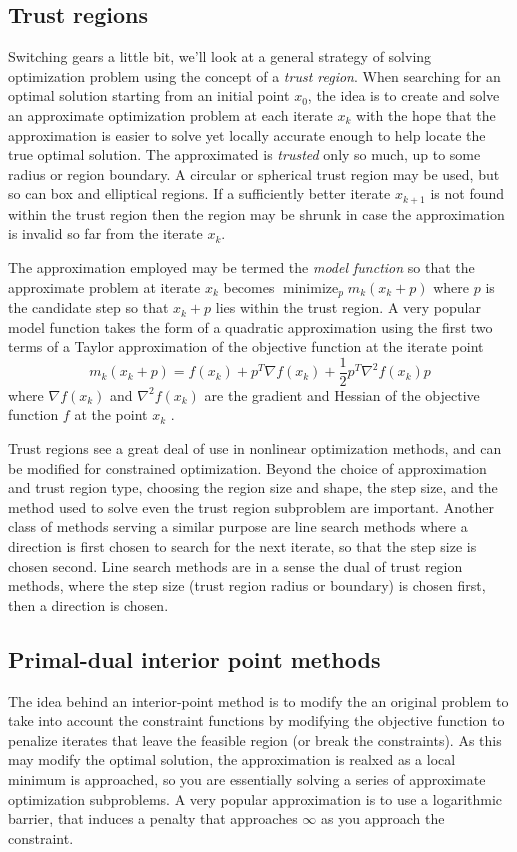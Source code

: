 \subsection{Trust regions}
Switching gears a little bit, we'll look at a general strategy of solving optimization problem using the concept of a \emph{trust region}. When searching for an optimal solution starting from an initial point $x_0$, the idea is to create and solve an approximate optimization problem at each iterate $x_k$ with the hope that the approximation is easier to solve yet locally accurate enough to help locate the true optimal solution. The approximated is \emph{trusted} only so much, up to some radius or region boundary. A circular or spherical trust region may be used, but so can box and elliptical regions. If a sufficiently better iterate $x_{k+1}$ is not found within the trust region then the region may be shrunk in case the approximation is invalid so far from the iterate $x_k$.

The approximation employed may be termed the \emph{model function} so that the approximate problem at iterate $x_k$ becomes $\operatorname{minimize}_p m_k(x_k + p)$ where $p$ is the candidate step so that $x_k + p$ lies within the trust region. A very popular model function takes the form of a quadratic approximation using the first two terms of a Taylor approximation of the objective function at the iterate point
\begin{equation}
  m_k(x_k + p) = f(x_k) + p^T \nabla f(x_k) + \frac{1}{2} p^T \nabla^2 f(x_k) p
\end{equation}
where $\nabla f(x_k)$ and $\nabla^2 f(x_k)$ are the gradient and Hessian of the objective function $f$ at the point $x_k$ \citep{More83}.

Trust regions see a great deal of use in nonlinear optimization methods, and can be modified for constrained optimization. Beyond the choice of approximation and trust region type, choosing the region size and shape, the step size, and the method used to solve even the trust region subproblem are important. Another class of methods serving a similar purpose are line search methods where a direction is first chosen to search for the next iterate, so that the step size is chosen second. Line search methods are in a sense the dual of trust region methods, where the step size (trust region radius or boundary) is chosen first, then a direction is chosen.

\subsection{Primal-dual interior point methods}
The idea behind an interior-point method is to modify the an original problem to take into account the constraint functions by modifying the objective function to penalize iterates that leave the feasible region (or break the constraints). As this may modify the optimal solution, the approximation is realxed as a local minimum is approached, so you are essentially solving a series of approximate optimization subproblems. A very popular approximation is to use a logarithmic barrier, that induces a penalty that approaches $\infty$ as you approach the constraint.

